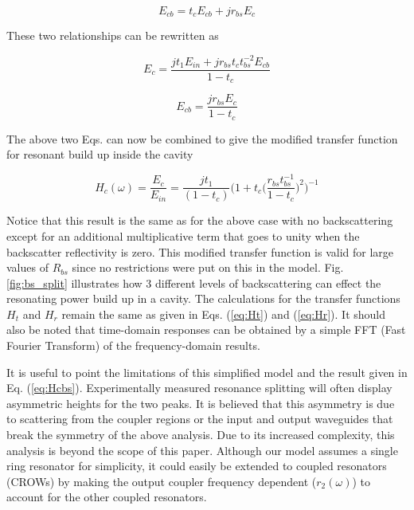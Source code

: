 \documentclass[10pt]{article}
\begin{document}
\begin{equation} 
E_{cb} = t_c E_{cb} + j r_{bs} E_c 
\end{equation}  

These two relationships can be rewritten as  

\begin{equation} E_c = \frac{j t_1 E_{in} + j r_{bs} t_c t_{bs}^{-2} E_{cb} }{1-t_c} \end{equation} 

\begin{equation} E_{cb} = \frac{j r_{bs} E_{c} }{1-t_c} \end{equation} 

The above two Eqs. can now be combined to give the modified transfer function for resonant build up inside the cavity 

\begin{equation} 
\boxed{ H_c (\omega) =  \frac{E_c}{E_{in}} = \frac{j t_1 }{(1-t_c)}  \bigg( 1+t_c \Big(\frac{r_{bs} t_{bs}^{-1}}{1-t_c}\Big)^2  \bigg)^{-1}      }
\label{eq:Hcbs} 
\end{equation} 

Notice that this result is the same as for the above case with no backscattering except for an additional multiplicative term that goes to unity when the backscatter reflectivity is zero.
This modified transfer function is valid for  large values of $R_{bs}$ since no restrictions were put on this in the model.
Fig. \ref{fig:bs_split} illustrates how 3 different levels of backscattering can effect the resonating  power build up in a cavity.
The calculations for the transfer functions  $H_t$ and  $H_r$  remain the same as given in Eqs. (\ref{eq:Ht}) and (\ref{eq:Hr}). It should also be noted that time-domain responses can be obtained by a simple FFT (Fast Fourier Transform) of the frequency-domain results.


It is useful to point the limitations of this simplified model and the result given in Eq. (\ref{eq:Hcbs}).  Experimentally measured resonance splitting will often display asymmetric heights for the two peaks.  It is believed that this asymmetry is due to scattering from the coupler regions or the input and output waveguides that break the symmetry of the above analysis. Due to its increased complexity, this analysis is beyond the scope of this paper.
Although our model assumes a single ring resonator for simplicity, it could easily be extended to coupled resonators (CROWs) \cite{Melloni2010} by making the output coupler frequency dependent ($r_2(\omega)$) to account for the other coupled resonators.
\end{document}
